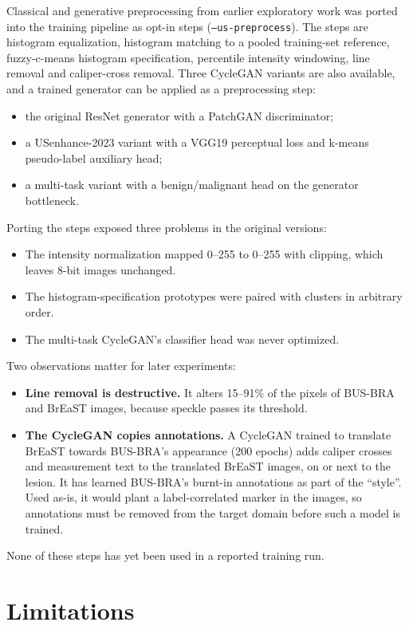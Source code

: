 \documentclass[11pt]{article}
\begin{document}
Classical and generative preprocessing from earlier exploratory work was
ported into the training pipeline as opt-in steps (\texttt{--us-preprocess}).
The steps are histogram equalization, histogram matching to a pooled
training-set reference, fuzzy-c-means histogram specification, percentile
intensity windowing, line removal and caliper-cross removal. Three CycleGAN
variants \citep{zhu2017cyclegan} are also available, and a trained generator
can be applied as a preprocessing step:
\begin{itemize}
  \item the original ResNet generator with a PatchGAN discriminator;
  \item a USenhance-2023 variant with a VGG19 perceptual loss and k-means
    pseudo-label auxiliary head;
  \item a multi-task variant with a benign/malignant head on the generator
    bottleneck.
\end{itemize}
Porting the steps exposed three problems in the original versions:
\begin{itemize}
  \item The intensity normalization mapped 0--255 to 0--255 with clipping,
    which leaves 8-bit images unchanged.
  \item The histogram-specification prototypes were paired with clusters in
    arbitrary order.
  \item The multi-task CycleGAN's classifier head was never optimized.
\end{itemize}
Two observations matter for later experiments:
\begin{itemize}
  \item \textbf{Line removal is destructive.} It alters 15--91\% of the pixels
    of BUS-BRA and BrEaST images, because speckle passes its threshold.
  \item \textbf{The CycleGAN copies annotations.} A CycleGAN trained to
    translate BrEaST towards BUS-BRA's appearance (200 epochs) adds caliper
    crosses and measurement text to the translated BrEaST images, on or next
    to the lesion. It has learned BUS-BRA's burnt-in annotations as part of
    the ``style''. Used as-is, it would plant a label-correlated marker in
    the images, so annotations must be removed from the target domain before
    such a model is trained.
\end{itemize}
None of these steps has yet been used in a reported training run.

\section{Limitations}
\label{sec:limitations}
\end{document}
